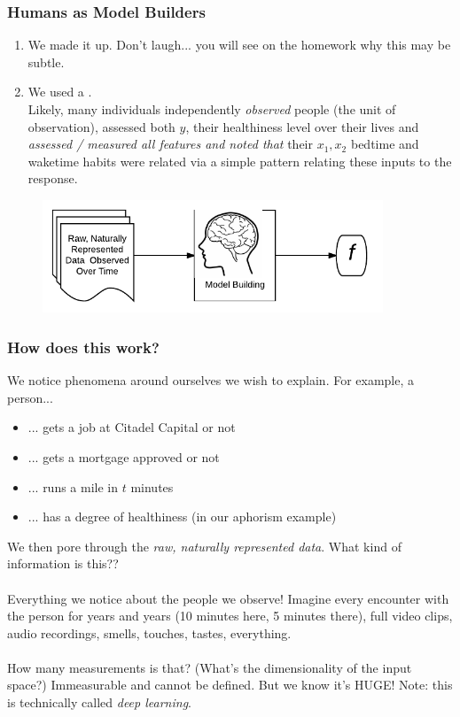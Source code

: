 \documentclass[handout]{beamer}
\begin{document}
\begin{frame}\frametitle{Humans as Model Builders}

\begin{enumerate}
\item We made it up. Don't laugh... you will see on the homework why this may be subtle.
\item We used a . \\

Likely, many individuals independently \textit{observed} people (the unit of observation), assessed both $y$, their healthiness level over their lives and \emph{assessed / measured all features and noted that} their $x_1, x_2$ bedtime and waketime habits were related via a simple pattern relating these inputs to the response.
\end{enumerate}

\begin{figure}
\centering
\includegraphics[width=4in]{human_learning}
\end{figure}
	
\end{frame}


\begin{frame}\frametitle{How does this work?}

We notice phenomena around ourselves we wish to explain. For example, a person...

\begin{itemize}
\item ... gets a job at Citadel Capital or not
\item ... gets a mortgage approved or not
\item ... runs a mile in $t$ minutes
\item ... has a degree of healthiness (in our aphorism example)
\end{itemize}

We then pore through the \textit{raw, naturally represented data}. What kind of information is this??\\~\\

Everything we notice about the people we observe! Imagine every encounter with the person for years and years (10 minutes here, 5 minutes there), full video clips, audio recordings, smells, touches, tastes, everything.\\~\\

How many measurements is that? (What's the dimensionality of the input space?) Immeasurable and cannot be defined. But we know it's HUGE! Note: this is technically called \emph{deep learning}.

\end{frame}
\end{document}
